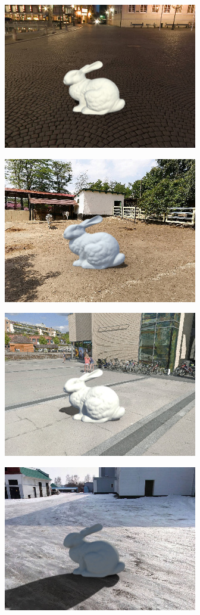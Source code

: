 \begin{multicols}{3}
\includegraphics[width=\mywidth]{pano_aqamdutlzvraki.jpg}

\includegraphics[width=\mywidth]{pano_amshyzgawxszwy.jpg}

\includegraphics[width=\mywidth]{pano_aojrzforebnjfs.jpg}

\includegraphics[width=\mywidth]{pano_apraeyhpkndfbl.jpg}


\end{multicols}
